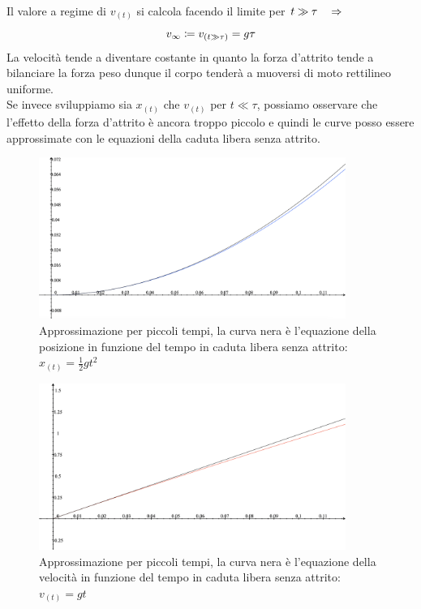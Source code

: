 \\
Il valore a regime di $v_{(t)}$ si calcola facendo il limite per $t\gg\tau\quad\Rightarrow\quad$
\begin{equation}
    v_\infty\coloneqq v_{\left( t\gg\tau \right)} = g\tau
\label{eq:forces:viscous_vlim}
\end{equation}
La velocità tende a diventare costante in quanto la forza d'attrito tende a
bilanciare la forza peso dunque il corpo tenderà a muoversi di moto
rettilineo uniforme.\\
Se invece sviluppiamo sia $x_{(t)}$ che $v_{(t)}$ per $t\ll\tau$,
possiamo osservare che l'effetto della forza d'attrito è ancora troppo
piccolo e quindi le curve posso essere approssimate con le equazioni della
caduta libera senza attrito.

\begin{figure}[htbp]
    \begin{center}
    \includegraphics[width=10cm]{images/cadsmorzx.png}
    \caption{Approssimazione per piccoli tempi, la curva nera è l'equazione
    della posizione in funzione del tempo in caduta libera senza attrito:
    $x_{(t)} = \frac12gt^2$}
\end{center}
\label{fig:forces:freefall:approx_x}
\end{figure}

\begin{figure}[htbp]
    \begin{center}
    \includegraphics[width=10cm]{images/cadsmorzv.png}
    \caption{Approssimazione per piccoli tempi, la curva nera è l'equazione
    della velocità in funzione del tempo in caduta libera senza attrito:
    $v_{(t)} = gt$}
\end{center}
\label{fig:forces:freefall:approx_v}
\end{figure}

